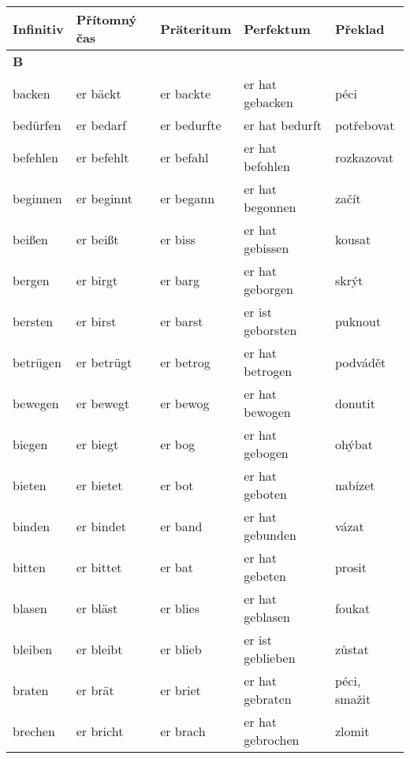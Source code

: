 \documentclass[a4paper,12pt]{report}
\begin{document}
  \begin{longtable}{ | m{2cm} | m{2.5cm} | m{2.5cm} | m{4cm} | m{3cm} | }
    \hline
    Infinitiv   & Přítomný čas  & Präteritum   & Perfektum          & Překlad            \\
    \hline
    \textbf{B}  &               &              &                    &                    \\
    backen      & er bäckt      & er backte    & er hat gebacken    & péci               \\
    bedürfen    & er bedarf     & er bedurfte  & er hat bedurft     & potřebovat         \\
    befehlen    & er befehlt    & er befahl    & er hat befohlen    & rozkazovat         \\
    beginnen    & er beginnt    & er begann    & er hat begonnen    & začít              \\
    beißen      & er beißt      & er biss      & er hat gebissen    & kousat             \\
    bergen      & er birgt      & er barg      & er hat geborgen    & skrýt              \\
    bersten     & er birst      & er barst     & er ist geborsten   & puknout            \\
    betrügen    & er betrügt    & er betrog    & er hat betrogen    & podvádět           \\
    bewegen     & er bewegt     & er bewog     & er hat bewogen     & donutit            \\
    biegen      & er biegt      & er bog       & er hat gebogen     & ohýbat             \\
    bieten      & er bietet     & er bot       & er hat geboten     & nabízet            \\
    binden      & er bindet     & er band      & er hat gebunden    & vázat              \\
    bitten      & er bittet     & er bat       & er hat gebeten     & prosit             \\
    blasen      & er bläst      & er blies     & er hat geblasen    & foukat             \\
    bleiben     & er bleibt     & er blieb     & er ist geblieben   & zůstat             \\
    braten      & er brät       & er briet     & er hat gebraten    & péci, smažit       \\
    brechen     & er bricht     & er brach     & er hat gebrochen   & zlomit             \\

\end{longtable}
\end{document}
